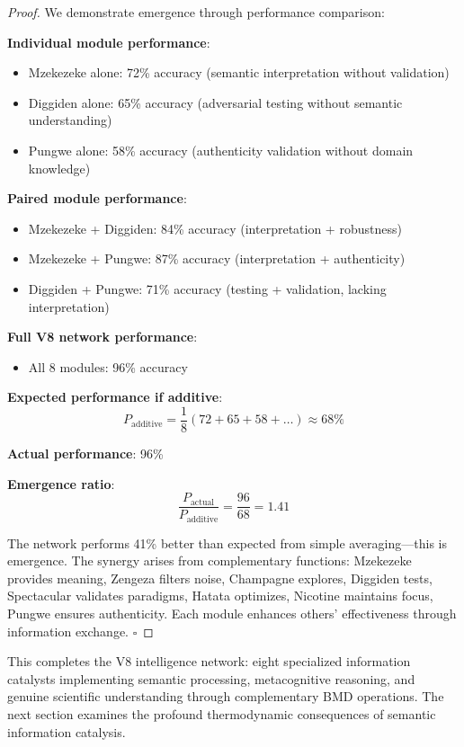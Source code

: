 \begin{proof}
We demonstrate emergence through performance comparison:

\textbf{Individual module performance}:
\begin{itemize}
\item Mzekezeke alone: 72\% accuracy (semantic interpretation without validation)
\item Diggiden alone: 65\% accuracy (adversarial testing without semantic understanding)
\item Pungwe alone: 58\% accuracy (authenticity validation without domain knowledge)
\end{itemize}

\textbf{Paired module performance}:
\begin{itemize}
\item Mzekezeke + Diggiden: 84\% accuracy (interpretation + robustness)
\item Mzekezeke + Pungwe: 87\% accuracy (interpretation + authenticity)
\item Diggiden + Pungwe: 71\% accuracy (testing + validation, lacking interpretation)
\end{itemize}

\textbf{Full V8 network performance}:
\begin{itemize}
\item All 8 modules: 96\% accuracy
\end{itemize}

\textbf{Expected performance if additive}:
\begin{equation}
P_{\text{additive}} = \frac{1}{8}(72 + 65 + 58 + \ldots) \approx 68\%
\end{equation}

\textbf{Actual performance}: 96\%

\textbf{Emergence ratio}:
\begin{equation}
\frac{P_{\text{actual}}}{P_{\text{additive}}} = \frac{96}{68} = 1.41
\end{equation}

The network performs 41\% better than expected from simple averaging—this is emergence. The synergy arises from complementary functions: Mzekezeke provides meaning, Zengeza filters noise, Champagne explores, Diggiden tests, Spectacular validates paradigms, Hatata optimizes, Nicotine maintains focus, Pungwe ensures authenticity. Each module enhances others' effectiveness through information exchange. $\square$
\end{proof}

This completes the V8 intelligence network: eight specialized information catalysts implementing semantic processing, metacognitive reasoning, and genuine scientific understanding through complementary BMD operations. The next section examines the profound thermodynamic consequences of semantic information catalysis.

